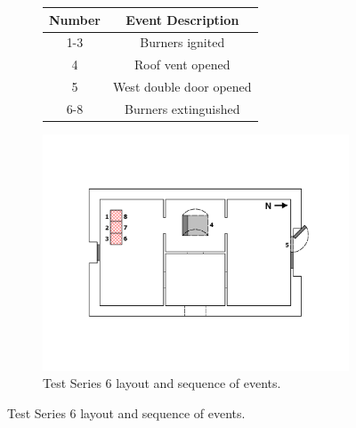 \documentclass[12pt,oneside]{book}
\begin{document}
\begin{figure}[!ht]
\begin{minipage}[b]{0.8\columnwidth}
\begin{flushleft}
\begin{figure}[!ht]
\begin{minipage}[b]{0.8\columnwidth}
	\begin{flushleft}
	\small
	\begin{tabular}[b]{cc}
 	\toprule
 	\textbf{Number} & \textbf{Event Description} \\
 	\midrule
 	1-3  & Burners ignited \\
 	4	 & Roof vent opened \\
 	5 	 & West double door opened \\
 	6-8  & Burners extinguished \\
	\bottomrule
	\end{tabular}
	\end{flushleft}
\end{minipage}
\begin{minipage}[b]{0.9\columnwidth}
	\vspace{15pt}
	\centering
	\includegraphics[width=\columnwidth]{../Figures/Floor_Plans/East_Structure_Test_6}
\end{minipage}
\caption{Test Series 6 layout and sequence of events.}
\label{fig:east_test_6}
\end{figure}
\FloatBarrier


\end{flushleft}
\end{minipage}
\end{figure}
\end{document}
